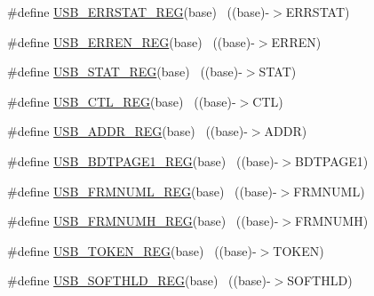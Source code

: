 \begin{DoxyCompactItemize}
\item 
\#define \hyperlink{group___u_s_b___register___accessor___macros_ga7b4d3f12786ff16600f22ef96106cb78}{U\+S\+B\+\_\+\+E\+R\+R\+S\+T\+A\+T\+\_\+\+R\+EG}(base)                                    ~((base)-\/$>$E\+R\+R\+S\+T\+AT)
\item 
\#define \hyperlink{group___u_s_b___register___accessor___macros_ga5bcc0b18083d1e8ca3df5215acd96ffd}{U\+S\+B\+\_\+\+E\+R\+R\+E\+N\+\_\+\+R\+EG}(base)                                        ~((base)-\/$>$E\+R\+R\+EN)
\item 
\#define \hyperlink{group___u_s_b___register___accessor___macros_gaeab7fa3c051021f1fc0efcb46483e7b4}{U\+S\+B\+\_\+\+S\+T\+A\+T\+\_\+\+R\+EG}(base)                                          ~((base)-\/$>$S\+T\+AT)
\item 
\#define \hyperlink{group___u_s_b___register___accessor___macros_gad64167a6ab05b5ae9dba249da9ad7af7}{U\+S\+B\+\_\+\+C\+T\+L\+\_\+\+R\+EG}(base)                                            ~((base)-\/$>$C\+TL)
\item 
\#define \hyperlink{group___u_s_b___register___accessor___macros_ga03f0a41161dca06c094577e93612fcc9}{U\+S\+B\+\_\+\+A\+D\+D\+R\+\_\+\+R\+EG}(base)                                          ~((base)-\/$>$A\+D\+DR)
\item 
\#define \hyperlink{group___u_s_b___register___accessor___macros_gaee966956afc1831775ca4985a36bef1c}{U\+S\+B\+\_\+\+B\+D\+T\+P\+A\+G\+E1\+\_\+\+R\+EG}(base)                                  ~((base)-\/$>$B\+D\+T\+P\+A\+G\+E1)
\item 
\#define \hyperlink{group___u_s_b___register___accessor___macros_ga93fd74f20933fb2aa15f86de9b46436a}{U\+S\+B\+\_\+\+F\+R\+M\+N\+U\+M\+L\+\_\+\+R\+EG}(base)                                    ~((base)-\/$>$F\+R\+M\+N\+U\+ML)
\item 
\#define \hyperlink{group___u_s_b___register___accessor___macros_ga8a4e8ec678086774fac29ef632712987}{U\+S\+B\+\_\+\+F\+R\+M\+N\+U\+M\+H\+\_\+\+R\+EG}(base)                                    ~((base)-\/$>$F\+R\+M\+N\+U\+MH)
\item 
\#define \hyperlink{group___u_s_b___register___accessor___macros_ga58de1b6987e899f3460e032f9f28bf99}{U\+S\+B\+\_\+\+T\+O\+K\+E\+N\+\_\+\+R\+EG}(base)                                        ~((base)-\/$>$T\+O\+K\+EN)
\item 
\#define \hyperlink{group___u_s_b___register___accessor___macros_ga09aac565b7f5e742a25732100fbf8889}{U\+S\+B\+\_\+\+S\+O\+F\+T\+H\+L\+D\+\_\+\+R\+EG}(base)                                    ~((base)-\/$>$S\+O\+F\+T\+H\+LD)

\end{DoxyCompactItemize}
